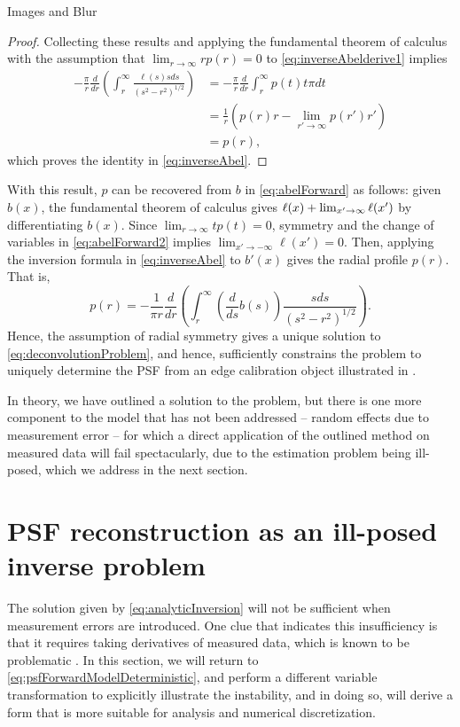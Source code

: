 \begin{chapter}{Images and Blur}
\begin{proof}
  Collecting these results and applying the fundamental theorem of calculus with the assumption that $\lim_{r\to\infty}rp(r) = 0$ to \eqref{eq:inverseAbelderive1} implies
  \begin{align}
    -\frac{\pi}{r} \frac{d}{dr} \left(\int_r^\infty \frac{\ell(s) s ds}{ (s^2 - r^2)^{1/2} } \right) 
      &= -\frac{\pi}{r} \frac{d}{dr} \int_r^\infty p(t) t \pi dt \nonumber\\
      &= \frac{1}{r} \left(p(r)r - \lim_{r'\to\infty}p(r')r'\right) \nonumber\\
      &= p(r),
  \end{align}
  which proves the identity in \eqref{eq:inverseAbel}.
\end{proof}
  
  With this result, $p$ can be recovered from $b$ in \eqref{eq:abelForward} as follows: given $b(x)$, the fundamental theorem of calculus gives $\ell(x) + \lim_{x'\to\-\infty}\ell(x')$ by differentiating $b(x)$.
  Since $\lim_{r\to\infty}tp(t) = 0$, symmetry and the change of variables in \eqref{eq:abelForward2} implies $\lim_{x'\to-\infty}\ell(x') = 0$. 
  Then, applying the inversion formula in \eqref{eq:inverseAbel} to $b'(x)$ gives the radial profile $p(r)$.
  That is,
  \begin{equation} \label{eq:analyticInversion}
    p(r) = -\frac{1}{\pi r} \frac{d}{dr}\left(\int_r^\infty \left(\frac{d}{ds} b(s)\right) \frac{ s ds}{ (s^2 - r^2)^{1/2} } \right).  
  \end{equation}
  Hence, the assumption of radial symmetry gives a unique solution to \eqref{eq:deconvolutionProblem}, and hence, sufficiently constrains the problem to uniquely determine the PSF from an edge calibration object illustrated in .

  In theory, we have outlined a solution to the problem, but there is one more component to the model that has not been addressed -- random effects due to measurement error -- for which a direct application of the outlined method on measured data will fail spectacularly, due to the estimation problem being ill-posed, which we address in the next section.

\section{PSF reconstruction as an ill-posed inverse problem}
  
  The solution given by \eqref{eq:analyticInversion} will not be sufficient when measurement errors are introduced. 
  One clue that indicates this insufficiency is that it requires taking derivatives of measured data, which is known to be problematic \citep{hanke2001}.
  In this section, we will return to \eqref{eq:psfForwardModelDeterministic}, and perform a different variable transformation to explicitly illustrate the instability, and in doing so, will derive a form that is more suitable for analysis and numerical discretization.


\end{chapter}
